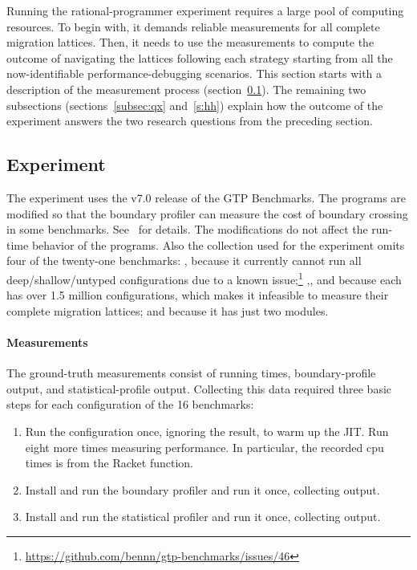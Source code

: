 \newcommand{\numgtp}{16}
\newcommand{\boundaryMB}{536} %
\newcommand{\statisticalMB}{4645} %
\newcommand{\runtimeMB}{44}

Running the rational-programmer experiment requires a large pool of
computing resources.  To begin with, it demands reliable measurements for
all complete migration lattices. Then, it needs to use the measurements to
compute the outcome of navigating the
lattices following each strategy starting from all the now-identifiable performance-debugging
scenarios. This section starts with a description of the measurement
process (section~\ref{subsec:experiment}). The remaining two subsections
(sections~\ref{subsec:qx} and~\ref{s:hh}) explain how the outcome of the
experiment answers the two research questions from the preceding
section.

\subsection{Experiment} \label{subsec:experiment} \label{sec:data}

The experiment uses the v7.0 release of the GTP Benchmarks. The programs are
modified so that the boundary profiler can measure the cost of boundary crossing
in some benchmarks.
See~ for details.
The modifications do not affect the run-time behavior of the programs.  Also the
collection used for the experiment omits four of the twenty-one benchmarks:
, because it currently cannot run all deep/shallow/untyped
configurations due to a known issue;\footnote{
\url{https://github.com/bennn/gtp-benchmarks/issues/46}}
,, and  because each has over 1.5
million configurations, which makes it infeasible to measure their complete
migration lattices; and  because it has just two modules.

\paragraph{Measurements} 

The ground-truth measurements consist of running times, boundary-profile output,
and statistical-profile output.  Collecting this data required three basic steps
for each configuration of the \numgtp{} benchmarks:
\begin{enumerate}

\item Run the configuration once, ignoring the result, to warm up the JIT.  Run
    eight more times measuring performance.  In particular, the recorded {cpu
    time}s is from the Racket  function.

\item Install and run the boundary profiler and run it once, collecting output.

\item Install and run the statistical profiler and run it once, collecting
output.

\end{enumerate}

